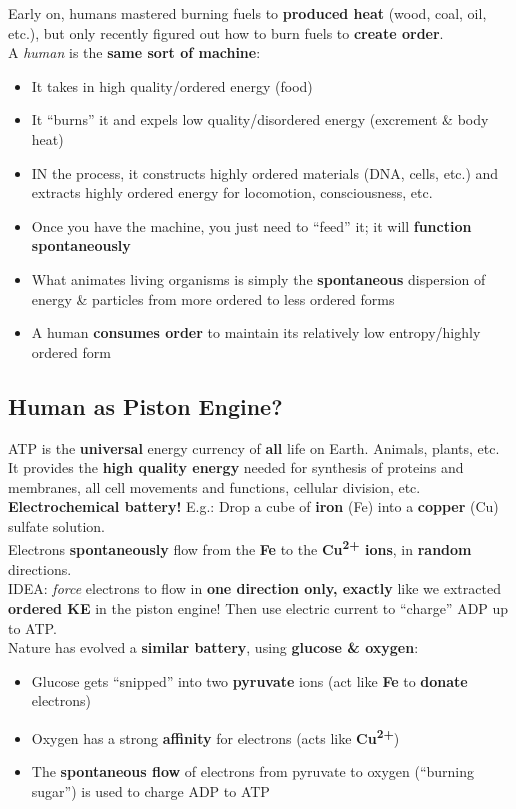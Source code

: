 \documentclass[12pt]{article}
\theoremstyle{definition}
\begin{document}
Early on, humans mastered burning fuels to \textbf{produced heat} (wood, coal, oil, etc.), but only recently figured out how to burn fuels to \textbf{create order}. \\

A \emph{human} is the \textbf{same sort of machine}:
\begin{itemize}
  \item It takes in high quality/ordered energy (food)
  \item It ``burns'' it and expels low quality/disordered energy (excrement \& body heat)
  \item IN the process, it constructs highly ordered materials (DNA, cells, etc.) and extracts highly ordered energy for locomotion, consciousness, etc.
  \item Once you have the machine, you just need to ``feed'' it;
  it will \textbf{function spontaneously}
  \item What animates living organisms is simply the \textbf{spontaneous} dispersion of energy \& particles from more ordered to less ordered forms
  \item A human \textbf{consumes order} to maintain its relatively low entropy/highly ordered form
\end{itemize}

\subsection{Human as Piston Engine?}
ATP is the \textbf{universal} energy currency of \textbf{all} life on Earth.
Animals, plants, etc. \\

It provides the \textbf{high quality energy} needed for synthesis of proteins and membranes, all cell movements and functions, cellular division, etc. \\

\textbf{Electrochemical battery!} E.g.: Drop a cube of \textbf{iron} (Fe) into a \textbf{copper} (Cu) sulfate solution. \\
Electrons \textbf{spontaneously} flow from the \textbf{Fe} to the \textbf{Cu\textsuperscript{2+} ions}, in \textbf{random} directions. \\
IDEA: \emph{force} electrons to flow in \textbf{one direction only, exactly} like we extracted \textbf{ordered KE} in the piston engine!
Then use electric current to ``charge'' ADP up to ATP. \\

Nature has evolved a \textbf{similar battery}, using \textbf{glucose \& oxygen}:
\begin{itemize}
  \item Glucose gets ``snipped'' into two \textbf{pyruvate} ions (act like \textbf{Fe} to \textbf{donate} electrons)
  \item Oxygen has a strong \textbf{affinity} for electrons (acts like \textbf{Cu\textsuperscript{2+}})
  \item The \textbf{spontaneous flow} of electrons from pyruvate to oxygen (``burning sugar'') is used to charge ADP to ATP
\end{itemize}
\end{document}
